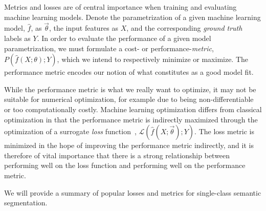 Metrics and losses are of central importance when training and evaluating machine learning models.
Denote the parametrization of a given machine learning model, $\hat{f}$, as $\vec{\theta}$, the input features as $X$, and the corresponding \textit{ground truth} labels as $Y$.
In order to evaluate the performance of a given model parametrization, we must formulate a cost- or performance-\textit{metric}, $P(\hat{f}(X; \theta); Y)$, which we intend to respectively minimize or maximize.
The performance metric encodes our notion of what constitutes as a good model fit.

While the performance metric is what we really want to optimize, it may not be suitable for numerical optimization, for example due to being non-differentiable or too computationally costly.
Machine learning optimization differs from classical optimization in that the performance metric is indirectly maximized through the optimization of a surrogate \textit{loss} function~\cite[p.~272]{goodfellow}, $\mathcal{L}(\hat{f}(X; \vec{\theta});  Y)$.
The loss metric is minimized in the hope of improving the performance metric indirectly, and it is therefore of vital importance that there is a strong relationship between performing well on the loss function and performing well on the performance metric.

We will provide a summary of popular losses and metrics for single-class semantic segmentation.
